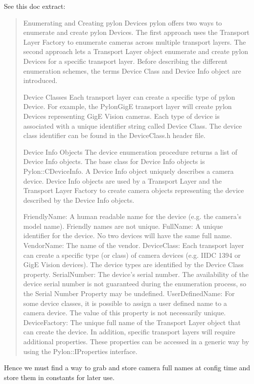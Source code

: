 See this doc extract:

\begin{quotation}
Enumerating and Creating pylon Devices
pylon offers two ways to enumerate and create pylon Devices. The first approach uses the Transport Layer Factory to enumerate cameras across multiple transport layers. The second approach lets a Transport Layer object enumerate and create pylon Devices for a specific transport layer. Before describing the different enumeration schemes, the terms Device Class and Device Info object are introduced.

Device Classes
Each transport layer can create a specific type of pylon Device. For example, the PylonGigE transport layer will create pylon Devices representing GigE Vision cameras. Each type of device is associated with a unique identifier string called Device Class. The device class identifier can be found in the DeviceClass.h header file.

Device Info Objects
The device enumeration procedure returns a list of Device Info objects. The base class for Device Info objects is Pylon::CDeviceInfo. A Device Info object uniquely describes a camera device. Device Info objects are used by a Transport Layer and the Transport Layer Factory to create camera objects representing the device described by the Device Info objects.

FriendlyName:	A human readable name for the device (e.g. the camera's model name). Friendly names are not unique.
FullName:	A unique identifier for the device. No two devices will have the same full name.
VendorName:	The name of the vendor.
DeviceClass:	Each transport layer can create a specific type (or class) of camera devices (e.g. IIDC 1394 or GigE Vision devices). The device types are identified by the Device Class property.
SerialNumber:	The device's serial number. The availability of the device serial number is not guaranteed during the enumeration process, so the Serial Number Property may be undefined.
UserDefinedName:	For some device classes, it is possible to assign a user defined name to a camera device. The value of this property is not necessarily unique.
DeviceFactory:	The unique full name of the Transport Layer object that can create the device.
In addition, specific transport layers will require additional properties. These properties can be accessed in a generic way by using the Pylon::IProperties interface.
\end{quotation}

Hence we must find a way to grab and store camera full names at config time and store them in constants for later use.

